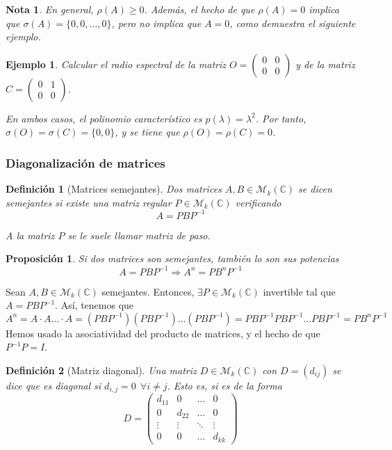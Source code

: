 \documentclass[11pt, a4paper]{article}
\makeatletter
\newif\IfInSansMode
\let\oldsf\sffamily
\renewcommand*{\sffamily}{\oldsf\mathversion{sans}\InSansModetrue}
\let\oldnorm\normalfont
\renewcommand*{\normalfont}{\oldnorm\InSansModefalse\mathversion{normal}}
\renewenvironment{proof}[1][\proofname] {\vspace{-15pt}\par\pushQED{\qed}\normalfont\topsep6\p@\@plus6\p@\relax\trivlist\item[\hskip\labelsep\it#1\@addpunct{.}]\ignorespaces}{\popQED\endtrivlist\@endpefalse}
\numberwithin{equation}{section}
\newcommand{\m}[4]{%
  \begin{pmatrix} #1 & #2 \\ #3 & #4\end{pmatrix}
}
\renewenvironment{proof}[1][\proofname] {\par\pushQED{\qed}\normalfont\topsep6\p@\@plus6\p@\relax\trivlist\item[\hskip\labelsep\itshape\sffamily#1\@addpunct{.}]\ignorespaces}{\popQED\endtrivlist\@endpefalse}
\theoremstyle{theorem-style}
\newtheorem{nprop}{Proposición}[section]
\theoremstyle{definition-style}
\newtheorem{ndef}{Definición}[section]
\theoremstyle{remark-style}
\newtheorem*{nota}{Nota}
\theoremstyle{example-style}
\newtheorem{ejemplo}{Ejemplo}[section]
\makeatother
\begin{document}
\begin{nota}
  En general, $\rho(A) \ge 0$. Además, el hecho de que $\rho(A) = 0$  implica que $\sigma(A) = \{0, 0, \hdots ,0\}$, pero no implica que $A=0$, como demuestra el siguiente ejemplo.
  
\end{nota}

\begin{ejemplo} Calcular el radio espectral de la matriz $O = \m{0}{0}{0}{0}$ y de la matriz $C = \m{0}{1}{0}{0}$.

En ambos casos, el polinomio característico es $p(\lambda) = \lambda^2$. Por tanto, $\sigma(O) = \sigma(C) = \{0,0\}$, y se tiene que $\rho(O) = \rho(C) = 0$.
	
\end{ejemplo}

\subsubsection{Diagonalización de matrices}

\begin{ndef}[Matrices semejantes]
  Dos matrices $A, B \in \mathcal M_k(\mathbb C)$ se dicen \textit{semejantes} si
  existe una matriz regular $P \in \mathcal M_k(\mathbb C)$ verificando $$A
  = PBP^{-1}$$

A la matriz $P$ se le suele llamar \textit{matriz de paso}.
\end{ndef}

\begin{nprop} \label{potencias_semejantes}
  Si dos matrices son semejantes, también lo son sus potencias $$A = PBP^{-1}
  \Rightarrow A^n = PB^nP^{-1}$$
\end{nprop}

\begin{proof}
  Sean $A, B \in \mathcal M_k(\mathbb C)$ semejantes. Entonces, $\exists {P} \in
  \mathcal M_k(\mathbb C)$ invertible tal que $A = PBP^{-1}$. Así, tenemos que
$$A^n = A \cdot A \hdots \cdot A = (PBP^{-1})(PBP^{-1}) \hdots (PBP^{-1}) =
PBP^{-1}PBP^{-1}\hdots PBP^{-1} = PB^nP^{-1}$$ Hemos usado la asociatividad del producto de matrices, y el hecho de que $P^{-1}P = I$.
\end{proof}

\begin{ndef}[Matriz diagonal]
  Una matriz $D \in \mathcal M_k(\mathbb C)$ con $D = (d_{ij})$ se dice que es
  \textit{diagonal} si $d_{i,j} = 0\ \ \forall i \neq j$. Esto es, si es de la
  forma
$$ D =
\begin{pmatrix}
  d_{11} & 0 & \hdots & 0 \\
  0 & d_{22} & \hdots & 0 \\
  \vdots & \vdots & \ddots & \vdots \\
  0 & 0 & \hdots & d_{kk}
\end{pmatrix}$$

\end{ndef}
\end{document}
